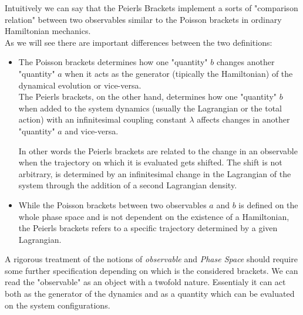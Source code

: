 \documentclass[Main]{subfiles}
\begin{document}
	\vspace{2mm}	
		Intuitively we can say that the Peierls Brackets implement a sorts of "comparison relation" between two observables similar to the Poisson brackets in ordinary Hamiltonian mechanics.\\
		As we will see there are important differences between the two definitions:
		\begin{itemize}
			\item The Poisson brackets determines how one "quantity" $b$ changes another "quantity" $a$ when it acts as the  generator (tipically the  Hamiltonian) of the dynamical evolution or vice-versa. \cite{Sharan2010}
	\\	
	The Peierls brackets, on the other hand, determines how one "quantity" $b$  when added to the system dynamics (usually the Lagrangian or the total action)  with an infinitesimal coupling constant $\lambda$ affects changes in another "quantity" $a$ and vice-versa.
	
	In other words the Peierls brackets are related to the change in an observable when the trajectory on which it is evaluated gets shifted.
	The shift is not arbitrary, is determined by an infinitesimal change in the Lagrangian of the system through the addition of a second Lagrangian density.
	
			\item While the Poisson brackets between two observables $a$ and $b$ is defined on the whole phase space and is not dependent on the existence of a Hamiltonian, the Peierls brackets refers to a specific trajectory determined by a given Lagrangian. 
		\end{itemize}
		A rigorous treatment of the notions of \emph{observable} and \emph{Phase Space} should require some further specification depending on which is the  considered brackets.		
		We can read the "observable" as an object with a twofold nature. Essentialy it can act both as the generator of the dynamics and as a quantity which can be evaluated on the system configurations.
\end{document}
